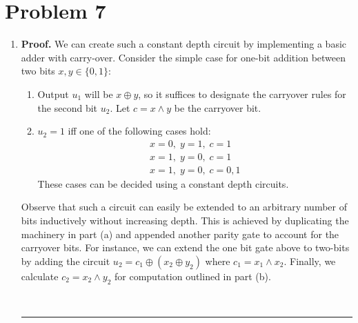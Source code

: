 \documentclass[12pt]{article}%
\newenvironment{proof}[1][Proof]{\textbf{#1.} }{\ \rule{0.5em}{0.5em}}
\begin{document}
\section{Problem 7}
\begin{enumerate}
  \item
  \begin{proof}
    We can create such a constant depth circuit by implementing a basic adder with carry-over. Consider the simple case for one-bit addition between two bits $x,y \in \{0,1\}$:
    \begin{enumerate}
      \item Output $u_1$ will be $x \oplus y$, so it suffices to designate the carryover rules for the second bit $u_2$. Let $c = x \wedge y$ be the carryover bit.
      \item $u_2 = 1$ iff one of the following cases hold:
      \begin{align*}
          x = 0, \; y =1,\; c = 1 \\
          x = 1, \; y = 0,\; c = 1 \\
          x = 1, \;y = 0,\; c = 0,1
      \end{align*}
      These cases can be decided using a constant depth circuits.
    \end{enumerate}
    Observe that such a circuit can easily be extended to an arbitrary number of bits inductively without increasing depth. This is achieved by duplicating the machinery in part (a) and appended another parity gate to account for the carryover bits. For instance, we can extend the one bit gate above to two-bits by adding the circuit $u_2 = c_1 \oplus (x_2 \oplus y_2)$ where $c_1 = x_1 \wedge x_2$. Finally, we calculate $c_2 = x_2 \wedge y_2$ for computation outlined in part (b).


\end{proof}
\end{enumerate}
\end{document}
